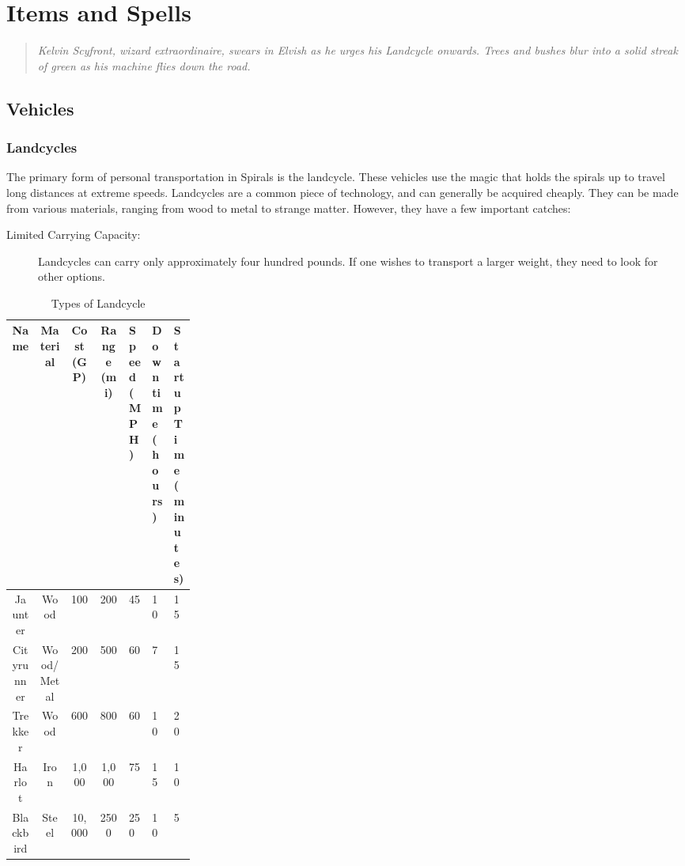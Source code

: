 \chapter{Items and Spells}
\begin{quote}
\itshape
Kelvin Scyfront, wizard extraordinaire, swears in Elvish as he urges his Landcycle onwards.
Trees and bushes blur into a solid streak of green as his machine flies down the road.
\end{quote}

\section{Vehicles}
\subsection{Landcycles}
The primary form of personal transportation in Spirals is the landcycle.
These vehicles use the magic that holds the spirals up to travel long distances at extreme speeds.
Landcycles are a common piece of technology, and can generally be acquired cheaply.
They can be made from various materials, ranging from wood to metal to strange matter.
However, they have a few important catches:
\begin{description}
\item[Limited Carrying Capacity:] Landcycles can carry only approximately four hundred pounds.
If one wishes to transport a larger weight, they need to look for other options.
\end{description}


\begin{table}[hb]
\caption{Types of Landcycle}
\begin{center}
\begin{tabular}{|c | c | c | c | p{0.07\linewidth} | p{0.1\linewidth} | p{0.1\linewidth}| }
\hline
Name & Material & Cost (GP) & Range (mi) & Speed (MPH) & Downtime (hours) & Startup Time (minutes) \\
\hline
Jaunter & Wood & 100 & 200 & 45 &10 & 15 \\
\hline
Cityrunner & Wood/Metal & 200 & 500 & 60 & 7 & 15 \\
\hline
Trekker & Wood & 600 & 800 & 60 & 10 & 20 \\
\hline
Harlot & Iron & 1,000 & 1,000 & 75 & 15 & 10 \\
\hline
Blackbird & Steel & 10,000 & 2500 & 250 & 10 & 5 \\
\hline

\end{tabular}
\end{center}
\end{table}

